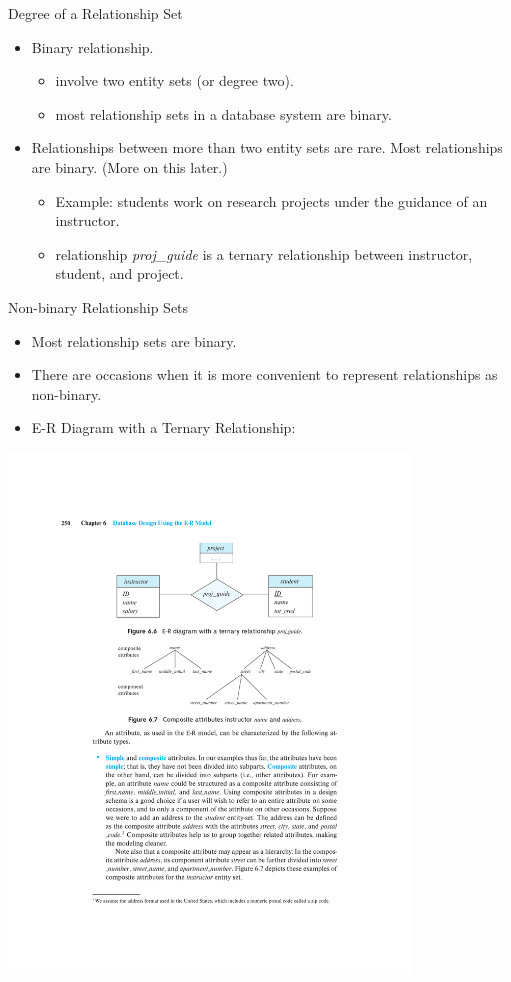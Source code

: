 \documentclass{beamer}
\begin{document}
\begin{frame}{Degree of a Relationship Set}
    \begin{itemize}
        \item Binary relationship.
        \begin{itemize}
            \item involve two entity sets (or degree two).
            \item most relationship sets in a database system are binary.
        \end{itemize}
        \item Relationships between more than two entity sets are rare. Most relationships are binary. (More on this later.)
        \begin{itemize}
            \item Example: students work on research projects under the guidance of an instructor.
            \item relationship \textit{proj\_guide} is a ternary relationship between instructor, student, and project.
        \end{itemize}
    \end{itemize}
\end{frame}

\begin{frame}{Non-binary Relationship Sets}
    \begin{itemize}
        \item Most relationship sets are binary.
        \item There are occasions when it is more convenient to represent relationships as non-binary.
        \item E-R Diagram with a Ternary Relationship:
    \end{itemize}
    \centering
    \includegraphics[trim={5cm 19cm 5cm 4cm}, clip, width=0.8\textwidth]{figures/p250}
\end{frame}
\end{document}
